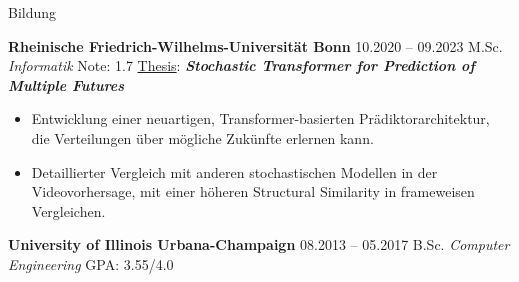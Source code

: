 \begin{rubric}{Bildung}


\entry*[] \textbf{Rheinische Friedrich-Wilhelms-Universität Bonn} \hfill 10.2020 -- 09.2023  \newline
  M.Sc. \emph{Informatik}  \hfill Note:  1.7 \newline %
  \underline{Thesis}:  \hspace*{5mm} \textit{\textbf{Stochastic Transformer for Prediction of Multiple Futures}} \newline 
  \vspace{\CVItemizeHeaderSpacing} \begin{itemize}[leftmargin=*, rightmargin=1cm]
  	\setlength{\itemsep}{\CVItemizeSpacing}  
  	\item Entwicklung einer neuartigen, Transformer-basierten Prädiktorarchitektur, die Verteilungen über mögliche Zukünfte erlernen kann.
  	\item Detaillierter Vergleich mit anderen stochastischen Modellen in der Videovorhersage, mit einer höheren Structural Similarity in frameweisen Vergleichen.  
 \end{itemize}

\entry*[] \textbf{University of Illinois Urbana-Champaign} \hfill 08.2013 -- 05.2017  \newline
 B.Sc. \emph{Computer Engineering} \hfill GPA: 3.55/4.0 \newline %



\end{rubric}